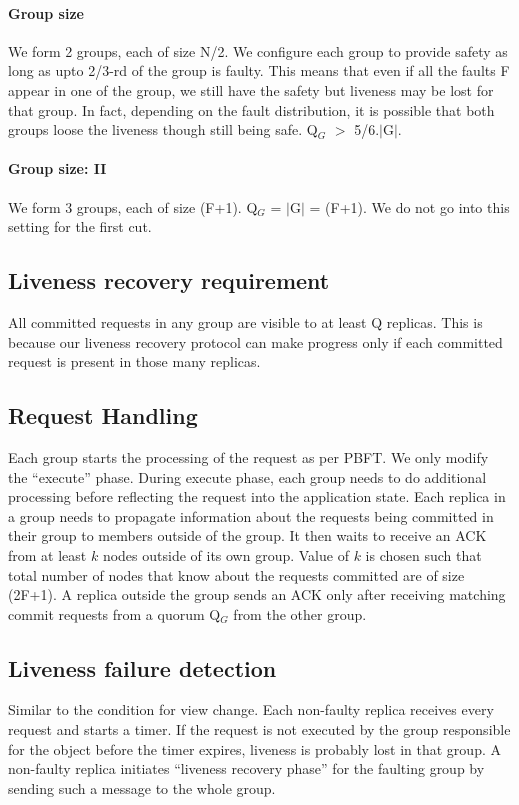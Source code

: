\documentclass[twocolumn,10pt]{article}
\begin{document}
\paragraph{Group size} We form 2 groups, each of size N/2. We configure
each group to provide safety as long as upto 2/3-rd of the group is faulty. 
This means that even if all the faults F appear in one of the group, we 
still have the safety but liveness may be lost for that group. In fact, depending on the fault
distribution, it is possible that both groups loose the liveness though still being safe.
Q$_{G}$ $>$ 5/6.$|$G$|$. %

\paragraph{Group size: II} We form 3 groups, each of size (F+1). Q$_{G}$ = $|$G$|$ = (F+1). We do not 
go into this setting for the first cut. 

\subsection{Liveness recovery requirement} All committed requests in any
group are visible to at least Q replicas. This is because our liveness recovery protocol can make progress
only if each committed request is present in those many replicas.


\subsection{Request Handling} Each group starts the processing of the request
as per PBFT. We only modify the ``execute'' phase. 
During execute phase, each group needs to do additional processing before
reflecting the request into the application state. Each
replica in a group needs to propagate information about the requests being
committed in their group to members outside of the group. It then waits to receive
an ACK from at least $k$ nodes outside of its own group. Value of $k$ is chosen
such that total number of nodes that know about the requests committed are of size
(2F+1). A replica outside the group sends an ACK only after receiving matching
commit requests from a quorum Q$_{G}$ from the other group.

\subsection{Liveness failure detection} Similar to the condition for view change.
Each non-faulty replica receives every request and 
starts a timer. If the request is not executed by the group responsible for the
object before the timer expires, liveness is probably lost in that group. A 
non-faulty replica initiates ``liveness recovery phase'' for the faulting group by
sending such a message to the whole group.
\end{document}
